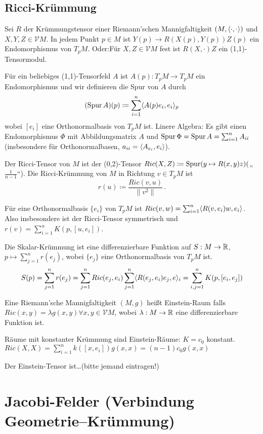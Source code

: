 \documentclass[a4paper,twoside,DIV15,BCOR12mm]{scrbook}
\renewcommand{\da}{\coloneqq}
\newcommand{\V}{\mathcal V}
\begin{document}
\section{Ricci-Krümmung}

Sei $R$ der Krümmungstensor einer Riemann’schen Mannigfaltigkeit $(M,\langle\cdot,\cdot\rangle)$ und $X,Y,Z \in \V M$. In jedem Punkt $p\in M$ ist $Y(p) \to R(X(p),Y(p))Z(p)$ ein Endomorphismus von $T_pM$. Oder:Für $X,Z \in \V M$ fest ist $R(X,\cdot)Z$ ein (1,1)-Tensormodul.

Für ein beliebiges (1,1)-Tensorfeld $A$ ist $A(p):T_pM \to T_pM$ ein Endomorphismus und wir definieren die Spur von $A$ durch
\[
(\spur A)(p) \da \sum_{i=1}^n \ksp {A(p)e_i}{e_i}_p
\] wobei $[e_i]$ eine Orthonormalbasis von $T_pM$ ist. Linere Algebra: Es gibt einen Endomorphismus $\Phi$ mit Abbildungsmatrix $A$ und $\mathop{\rm Spur}\nolimits \Phi = \mathop{\rm Spur}\nolimits A = \sum_{i=1}^n A_{ii}$ (insbesondere für Orthonormalbasen, $a_{ii} = \langle A_{e_i},e_i\rangle$).

Der Ricci-Tensor von $M$ ist der (0,2)-Tensor $Ric(X,Z)\da \spur(y\mapsto R(x,y)z)($„$\frac1{n-1}$“). Die Ricci-Krümmung von $M$ in Richtung $v\in T_pM$ ist \[r(u) \da \frac{Ric(v,u)}{\|v^2\|}\,.\]

Für eine Orthonormalbasis $\{e_i\}$ von $T_pM$ ist $Ric(v,w) = \sum_{i=1}^n \langle R(v,e_i)w,e_i\rangle$. Also insbesondere ist der Ricci-Tensor symmetrisch und $r(v) = \sum_{i=1}^n K(p,[u,e_i])$.

Die Skalar-Krümmung ist eine differenzierbare Funktion auf $S:M\to \mathbb{R}$, $p\mapsto \sum_{j=1}^n r(e_j)$, wobei $\{e_j\}$ eine Orthonormalbasis von $T_pM$ ist.
\[
S(p) = \sum_{j=1}^n r(e_j) = \sum_{j=1}^n Ric(e_j, e_i) \sum_{j=1}^n \langle R(e_j, e_i)e_j,e\rangle_i =\sum_{i,j =1}^n K(p, [e_i, e_j])
\]

Eine Riemann’sche Mannigfaltigkeit $(M,g)$ heißt Einstein-Raum falls $Ric(x,y) = \lambda g(x,y) \forall x,y\in \V M$, wobei $\lambda:M \to \mathbb{R}$ eine differenzierbare Funktion ist.

\begin{beispiel}
Räume mit konstanter Krümmung sind Einstein-Räume: $K=c_0$ konstant. $Ric(X,X)=\sum_{i=1}^n k([x,e_i]) g(x,x) = (n-1) c_0 g(x,x)$
\end{beispiel}

\begin{bemerkung}
Der Einstein-Tensor ist\dots (bitte jemand eintragen!)
\end{bemerkung}

\chapter{Jacobi-Felder (Verbindung Geometrie--Krümmung)}
\end{document}

